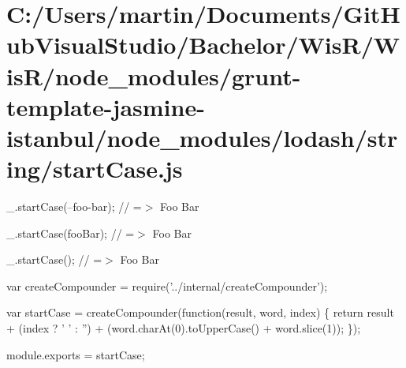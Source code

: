 \hypertarget{_c_1_2_users_2martin_2_documents_2_git_hub_visual_studio_2_bachelor_2_wis_r_2_wis_r_2node_moduleed6e7930574a8e05fc16a488094f4093}{}\section{C\+:/\+Users/martin/\+Documents/\+Git\+Hub\+Visual\+Studio/\+Bachelor/\+Wis\+R/\+Wis\+R/node\+\_\+modules/grunt-\/template-\/jasmine-\/istanbul/node\+\_\+modules/lodash/string/start\+Case.\+js}
\+\_\+.\+start\+Case(\textquotesingle{}--foo-\/bar\textquotesingle{}); // =$>$ \textquotesingle{}Foo Bar\textquotesingle{}

\+\_\+.\+start\+Case(\textquotesingle{}foo\+Bar\textquotesingle{}); // =$>$ \textquotesingle{}Foo Bar\textquotesingle{}

\+\_\+.\+start\+Case(\textquotesingle{}); // =$>$ \textquotesingle{}Foo Bar\textquotesingle{}


\begin{DoxyCodeInclude}
var createCompounder = require(\textcolor{stringliteral}{'../internal/createCompounder'});

var startCase = createCompounder(\textcolor{keyword}{function}(result, word, index) \{
  \textcolor{keywordflow}{return} result + (index ? \textcolor{charliteral}{' '} : \textcolor{stringliteral}{''}) + (word.charAt(0).toUpperCase() + word.slice(1));
\});

module.exports = startCase;
\end{DoxyCodeInclude}
 